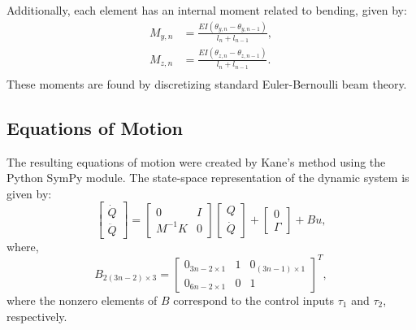 \documentclass[letterpaper,10pt,conference]{ieeeconf}   %
\begin{document}
Additionally, each element has an internal moment related to bending, given by:
%
\begin{equation}
\begin{aligned}
\label{eq:m_y}
M_{y,n} &= \frac{EI (\theta_{y,n} - \theta_{y,n-1})}{l_n + l_{n-1}}, \\
\label{eq:m_z}
M_{z,n} &= \frac{EI (\theta_{z,n} - \theta_{z,n-1})}{l_n + l_{n-1}}. \\
\end{aligned}
\end{equation}
%
These moments are found by discretizing standard Euler-Bernoulli beam theory. 

\subsection{Equations of Motion}
\label{sec:equationsmotion}

The resulting equations of motion were created by Kane's method using the Python SymPy module. The state-space representation of the dynamic system is given by:
%
\begin{equation}
\label{eq:eqmotion}
\begin{bmatrix}
 \dot{Q}\\
 \ddot{Q}
\end{bmatrix}
=
\begin{bmatrix}
 0 & I \\
 M^{-1} K & 0
\end{bmatrix} 
\begin{bmatrix}
 Q\\
 \dot{Q}
\end{bmatrix}
+
\begin{bmatrix}
0 \\
\Gamma
\end{bmatrix}
 + B u,
\end{equation} 
%
where,
%
\begin{equation}
\label{eq:B_matrix}
B_{2(3n-2) \times 3} = 
\begin{bmatrix}
0_{3n - 2 \times 1} & 1 & 0_{(3n - 1) \times 1} \\
0_{6n - 2\times 1} & 0 & 1
\end{bmatrix}^T,
\end{equation}
%
where the nonzero elements of $B$ correspond to the control inputs $\tau_1$ and $\tau_2$, respectively. 



\end{document}
